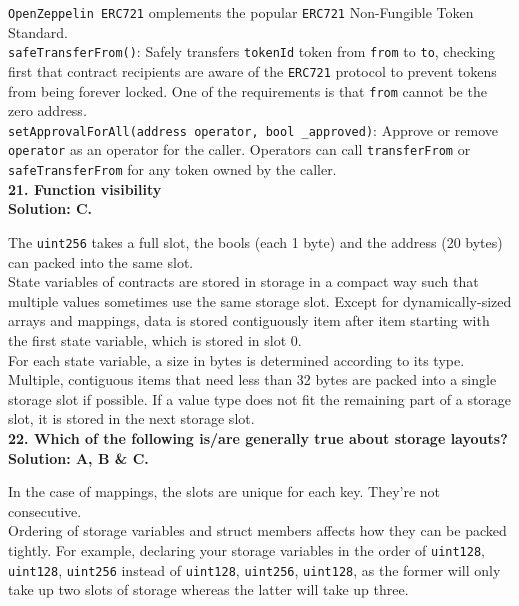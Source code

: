 \verb|OpenZeppelin ERC721| omplements the popular \verb|ERC721| Non-Fungible Token Standard.\\

\verb|safeTransferFrom()|: Safely transfers \verb|tokenId| token from \verb|from| to \verb|to|, checking first that contract recipients are aware of the \verb|ERC721| protocol to prevent tokens from being forever locked.
One of the requirements is that \verb|from| cannot be the zero address.\\

\verb|setApprovalForAll(address operator, bool _approved)|: Approve or remove \verb|operator| as an operator for the caller.
Operators can call \verb|transferFrom| or \verb|safeTransferFrom| for any token owned by the caller.\\

\textbf{21. Function visibility}\label{sec:exam3_q21}\\

\textbf{Solution: C.}

The \verb|uint256| takes a full slot, the bools (each 1 byte) and the address (20 bytes) can packed into the same slot.\\

State variables of contracts are stored in storage in a compact way such that multiple values sometimes use the same storage slot.
Except for dynamically-sized arrays and mappings, data is stored contiguously item after item starting with the first state variable, which is stored in slot 0.\\

For each state variable, a size in bytes is determined according to its type.
Multiple, contiguous items that need less than 32 bytes are packed into a single storage slot if possible.
If a value type does not fit the remaining part of a storage slot, it is stored in the next storage slot.\\

\textbf{22. Which of the following is/are generally true about storage layouts?}\label{sec:exam3_q22}\\

\textbf{Solution: A, B \& C.}

In the case of mappings, the slots are unique for each key.
They're not consecutive.\\

Ordering of storage variables and struct members affects how they can be packed tightly.
For example, declaring your storage variables in the order of \verb|uint128|, \verb|uint128|, \verb|uint256| instead of \verb|uint128|, \verb|uint256|, \verb|uint128|, as the former will only take up two slots of storage whereas the latter will take up three.\\

